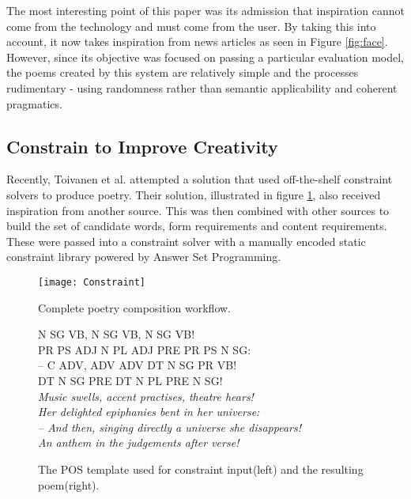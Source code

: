 The most interesting point of this paper was its admission that inspiration cannot come from the technology and must come from the user. By taking this into account, it now takes inspiration from news articles as seen in Figure \ref{fig:face}. However, since its objective was focused on passing a particular evaluation model, the poems created by this system are relatively simple and the processes rudimentary - using randomness rather than semantic applicability and coherent pragmatics.

\subsection{Constrain to Improve Creativity}
\label{sec:con}
Recently, Toivanen et al. attempted a solution that used off-the-shelf constraint solvers\cite{toivanen2013harnessing} to produce poetry. Their solution, illustrated in figure \ref{fig:con1}, also received inspiration from another source. This was then combined with other sources to build the set of candidate words, form requirements and content requirements. These were passed into a constraint solver with a manually encoded static constraint library powered by Answer Set Programming.

\begin{figure}[h!]
\centering
\texttt{[image: Constraint]}
\caption{Complete poetry composition workflow.}
\label{fig:con1}
\end{figure}

\begin{figure}[h!]
\begin{multicols}{2}
N SG VB, N SG VB, N SG VB!\\
PR PS ADJ N PL ADJ PRE PR PS N SG:\\
– C ADV, ADV ADV DT N SG PR VB!\\
\columnbreak DT N SG PRE DT N PL PRE N SG!\\
\textit{Music swells, accent practises, theatre hears!\\
Her delighted epiphanies bent in her universe:\\
– And then, singing directly a universe she disappears!\\
An anthem in the judgements after verse!
}
\end{multicols}
\caption{The POS template used for constraint input(left) and the resulting poem(right).}
\label{fig:con2}
\end{figure}

